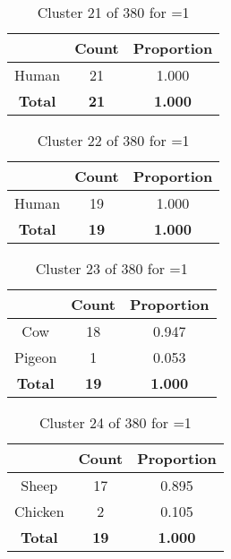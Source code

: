 \begin{table}[ht!]
\centering
\begin{tabular}{|c|c|c|}
\hline
\bf \Spec{} &\bf Count &\bf Proportion\\ \hline \hline
Human & 21 & 1.000\\ \hline
\hline
\bf Total & \bf 21 & \bf 1.000\\ \hline
\end{tabular}
\label{tab:cluster:21:1}
\caption{Cluster 21 of 380 for \minneigh{}=1}
\end{table}

\begin{table}[ht!]
\centering
\begin{tabular}{|c|c|c|}
\hline
\bf \Spec{} &\bf Count &\bf Proportion\\ \hline \hline
Human & 19 & 1.000\\ \hline
\hline
\bf Total & \bf 19 & \bf 1.000\\ \hline
\end{tabular}
\label{tab:cluster:22:1}
\caption{Cluster 22 of 380 for \minneigh{}=1}
\end{table}

\begin{table}[ht!]
\centering
\begin{tabular}{|c|c|c|}
\hline
\bf \Spec{} &\bf Count &\bf Proportion\\ \hline \hline
Cow & 18 & 0.947\\ \hline
Pigeon & 1 & 0.053\\ \hline
\hline
\bf Total & \bf 19 & \bf 1.000\\ \hline
\end{tabular}
\label{tab:cluster:23:1}
\caption{Cluster 23 of 380 for \minneigh{}=1}
\end{table}

\begin{table}[ht!]
\centering
\begin{tabular}{|c|c|c|}
\hline
\bf \Spec{} &\bf Count &\bf Proportion\\ \hline \hline
Sheep & 17 & 0.895\\ \hline
Chicken & 2 & 0.105\\ \hline
\hline
\bf Total & \bf 19 & \bf 1.000\\ \hline
\end{tabular}
\label{tab:cluster:24:1}
\caption{Cluster 24 of 380 for \minneigh{}=1}
\end{table}

